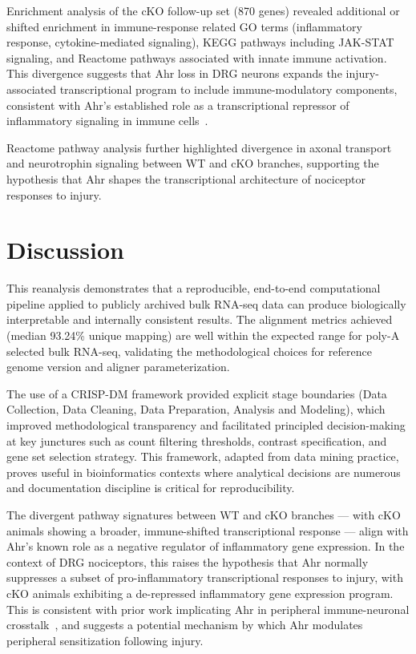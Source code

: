 \documentclass[conference]{IEEEtran}
\begin{document}
Enrichment analysis of the cKO follow-up set (870 genes) revealed additional or shifted enrichment in immune-response related GO terms (inflammatory response, cytokine-mediated signaling), KEGG pathways including JAK-STAT signaling, and Reactome pathways associated with innate immune activation. This divergence suggests that Ahr loss in DRG neurons expands the injury-associated transcriptional program to include immune-modulatory components, consistent with Ahr's established role as a transcriptional repressor of inflammatory signaling in immune cells~\cite{quintana2008}.

Reactome pathway analysis further highlighted divergence in axonal transport and neurotrophin signaling between WT and cKO branches, supporting the hypothesis that Ahr shapes the transcriptional architecture of nociceptor responses to injury.

\section{Discussion}

This reanalysis demonstrates that a reproducible, end-to-end computational pipeline applied to publicly archived bulk RNA-seq data can produce biologically interpretable and internally consistent results. The alignment metrics achieved (median 93.24\% unique mapping) are well within the expected range for poly-A selected bulk RNA-seq, validating the methodological choices for reference genome version and aligner parameterization.

The use of a CRISP-DM framework provided explicit stage boundaries (Data Collection, Data Cleaning, Data Preparation, Analysis and Modeling), which improved methodological transparency and facilitated principled decision-making at key junctures such as count filtering thresholds, contrast specification, and gene set selection strategy. This framework, adapted from data mining practice, proves useful in bioinformatics contexts where analytical decisions are numerous and documentation discipline is critical for reproducibility.

The divergent pathway signatures between WT and cKO branches — with cKO animals showing a broader, immune-shifted transcriptional response — align with Ahr's known role as a negative regulator of inflammatory gene expression. In the context of DRG nociceptors, this raises the hypothesis that Ahr normally suppresses a subset of pro-inflammatory transcriptional responses to injury, with cKO animals exhibiting a de-repressed inflammatory gene expression program. This is consistent with prior work implicating Ahr in peripheral immune-neuronal crosstalk~\cite{quintana2008}, and suggests a potential mechanism by which Ahr modulates peripheral sensitization following injury.
\end{document}
